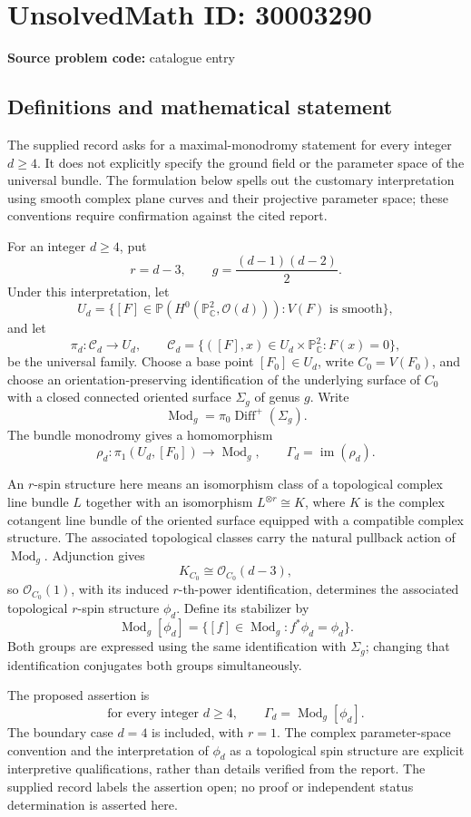 \documentclass[11pt]{article}
\newcommand{\C}{\mathbb{C}}
\newcommand{\PP}{\mathbb{P}}
\begin{document}
\section*{UnsolvedMath ID: 30003290}
\textbf{Source problem code:} catalogue entry
\subsection{Definitions and mathematical statement}
The supplied record asks for a maximal-monodromy statement for every integer \(d\geq 4\). It does not explicitly specify the ground field or the parameter space of the universal bundle. The formulation below spells out the customary interpretation using smooth complex plane curves and their projective parameter space; these conventions require confirmation against the cited report.

For an integer \(d\geq 4\), put
\[
r=d-3,\qquad g=\frac{(d-1)(d-2)}{2}.
\]
Under this interpretation, let
\[
U_d=\bigl\{[F]\in\PP(H^0(\PP^2_{\C},\mathcal O(d))): V(F)\text{ is smooth}\bigr\},
\]
and let
\[
\pi_d:\mathcal C_d\longrightarrow U_d,\qquad
\mathcal C_d=\{([F],x)\in U_d\times\PP^2_{\C}:F(x)=0\},
\]
be the universal family. Choose a base point \([F_0]\in U_d\), write \(C_0=V(F_0)\), and choose an orientation-preserving identification of the underlying surface of \(C_0\) with a closed connected oriented surface \(\Sigma_g\) of genus \(g\). Write
\[
\operatorname{Mod}_g=\pi_0\operatorname{Diff}^{+}(\Sigma_g).
\]
The bundle monodromy gives a homomorphism
\[
\rho_d:\pi_1(U_d,[F_0])\longrightarrow\operatorname{Mod}_g,
\qquad
\Gamma_d=\operatorname{im}(\rho_d).
\]

An \(r\)-spin structure here means an isomorphism class of a topological complex line bundle \(L\) together with an isomorphism \(L^{\otimes r}\cong K\), where \(K\) is the complex cotangent line bundle of the oriented surface equipped with a compatible complex structure. The associated topological classes carry the natural pullback action of \(\operatorname{Mod}_g\). Adjunction gives
\[
K_{C_0}\cong\mathcal O_{C_0}(d-3),
\]
so \(\mathcal O_{C_0}(1)\), with its induced \(r\)-th-power identification, determines the associated topological \(r\)-spin structure \(\phi_d\). Define its stabilizer by
\[
\operatorname{Mod}_g[\phi_d]
=\{[f]\in\operatorname{Mod}_g:f^*\phi_d=\phi_d\}.
\]
Both groups are expressed using the same identification with \(\Sigma_g\); changing that identification conjugates both groups simultaneously.

The proposed assertion is
\[
\text{for every integer }d\geq 4,\qquad
\Gamma_d=\operatorname{Mod}_g[\phi_d].
\]
The boundary case \(d=4\) is included, with \(r=1\). The complex parameter-space convention and the interpretation of \(\phi_d\) as a topological spin structure are explicit interpretive qualifications, rather than details verified from the report. The supplied record labels the assertion open; no proof or independent status determination is asserted here.
\end{document}
